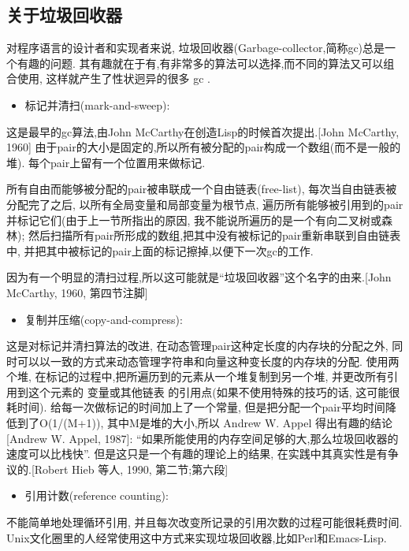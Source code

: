 \documentclass[a4paper]{article}
\begin{document}
\subsection{关于垃圾回收器}

对程序语言的设计者和实现者来说,
垃圾回收器(Garbage-collector,简称gc)总是一个有趣的问题.
其有趣就在于有,有非常多的算法可以选择,而不同的算法又可以组合使用,
这样就产生了性状迥异的很多 gc .

\begin{itemize}
\item 标记并清扫(mark-and-sweep):
\end{itemize}

这是最早的gc算法,由John McCarthy在创造Lisp的时候首次提出.[John McCarthy, 1960]
由于pair的大小是固定的,所以所有被分配的pair构成一个数组(而不是一般的堆).
每个pair上留有一个位置用来做标记.

所有自由而能够被分配的pair被串联成一个自由链表(free-list),
每次当自由链表被分配完了之后,
以所有全局变量和局部变量为根节点,
遍历所有能够被引用到的pair并标记它们(由于上一节所指出的原因,
我不能说所遍历的是一个有向二叉树或森林);
然后扫描所有pair所形成的数组,把其中没有被标记的pair重新串联到自由链表中,
并把其中被标记的pair上面的标记擦掉,以便下一次gc的工作.

因为有一个明显的清扫过程,所以这可能就是``垃圾回收器''这个名字的由来.[John McCarthy, 1960, 第四节注脚]

\begin{itemize}
\item 复制并压缩(copy-and-compress):
\end{itemize}

这是对标记并清扫算法的改进,
在动态管理pair这种定长度的内存块的分配之外,
同时可以以一致的方式来动态管理字符串和向量这种变长度的内存块的分配.
使用两个堆,
在标记的过程中,把所遍历到的元素从一个堆复制到另一个堆,
并更改所有引用到这个元素的 变量或其他链表 的引用点(如果不使用特殊的技巧的话,
这可能很耗时间).
给每一次做标记的时间加上了一个常量,
但是把分配一个pair平均时间降低到了O(1/(M+1)),
其中M是堆的大小,所以 Andrew W. Appel 得出有趣的结论[Andrew W. Appel, 1987]:
``如果所能使用的内存空间足够的大,那么垃圾回收器的速度可以比栈快''.
但是这只是一个有趣的理论上的结果,
在实践中其真实性是有争议的.[Robert Hieb 等人, 1990, 第二节;第六段]

\begin{itemize}
\item 引用计数(reference counting):
\end{itemize}

不能简单地处理循环引用,
并且每次改变所记录的引用次数的过程可能很耗费时间.
Unix文化圈里的人经常使用这中方式来实现垃圾回收器,比如Perl和Emacs-Lisp.
\end{document}

